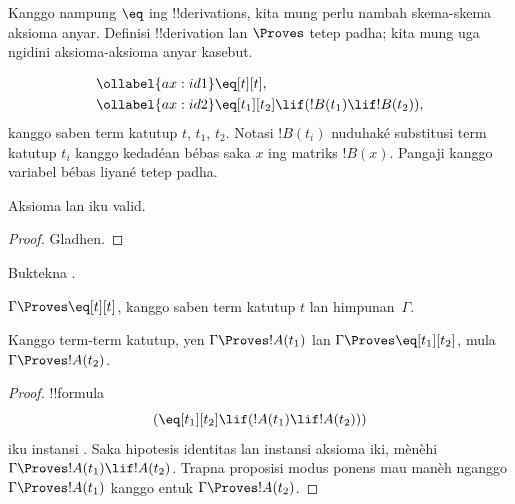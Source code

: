 \documentclass[../../../include/open-logic-section]{subfiles}
\begin{document}


Kanggo nampung $\eq$ ing !!{derivation}s, kita mung perlu nambah
skema-skema aksioma anyar. Definisi !!{derivation} lan $\Proves$ tetep
padha; kita mung uga ngidini aksioma-aksioma anyar kasebut.

\begin{defn}
\begin{align}
\ollabel{ax:id1} & \eq[t][t], \\
\ollabel{ax:id2} & \eq[t_1][t_2] \lif (!B(t_1) \lif
  !B(t_2)),
\end{align}
kanggo saben term katutup $t$, $t_1$, $t_2$.
Notasi $!B(t_i)$ nuduhaké substitusi term katutup $t_i$
kanggo kedadéan bébas saka $x$ ing matriks $!B(x)$.
Pangaji kanggo variabel bébas liyané tetep padha.
\end{defn}

\begin{prop}
  Aksioma  lan  iku valid.
\end{prop}

\begin{proof}
  Gladhen.
\end{proof}

\begin{prob}
Buktekna .
\end{prob}

\begin{prop}
 $\Gamma \Proves \eq[t][t]$, kanggo saben term katutup $t$ lan
 himpunan~$\Gamma$.
\end{prop}

\begin{prop}
  Kanggo term-term katutup, yen $\Gamma \Proves !A(t_1)$ lan $\Gamma
  \Proves \eq[t_1][t_2]$, mula $\Gamma \Proves !A(t_2)$.
\end{prop}

\begin{proof}
!!{formula}
\[
(\eq[t_1][t_2] \lif (!A(t_1) \lif !A(t_2)))
\]
iku instansi . Saka hipotesis identitas lan instansi aksioma iki,
 mènèhi $\Gamma\Proves !A(t_1)\lif !A(t_2)$.
Trapna proposisi modus ponens mau manèh nganggo
$\Gamma\Proves !A(t_1)$ kanggo entuk $\Gamma\Proves !A(t_2)$.
\end{proof}
\end{document}
